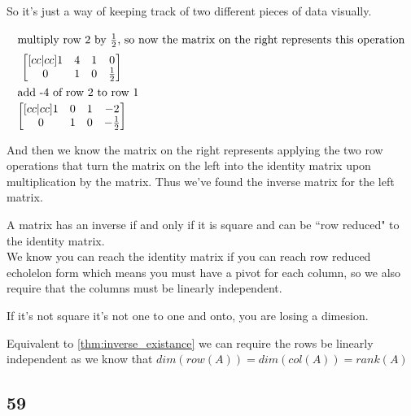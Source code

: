 \documentclass[11pt]{book}
\begin{document}
So it's just a way of keeping track of two different pieces of data visually.

\begin{gather*}
    \intertext{multiply row 2 by $\frac{1}{2}$, so now the matrix on the right represents this operation}
    \begin{bmatrix}[c c | c c]
    	1 & 4 & 1 & 0 \\
    	0 & 1 & 0 & \frac{1}{2} 
    \end{bmatrix}\\
    \intertext{add -4 of row 2 to row 1}
    \begin{bmatrix}[c c | c c]
    	1 & 0 & 1 & -2 \\
    	0 & 1 & 0 & -\frac{1}{2} 
    \end{bmatrix}
\end{gather*}

And then we know the matrix on the right represents applying the two row operations that turn the matrix on the left into the identity matrix upon multiplication by the matrix. Thus we've found the inverse matrix for the left matrix.

\begin{thm}\label{thm:inverse_existance}
    A matrix has an inverse if and only if it is square and can be ``row reduced" to the identity matrix.\\
    We know you can reach the identity matrix if you can reach row reduced echolelon form which means you must have a pivot for each column, so we also require that the columns must be linearly independent.
\end{thm}

\begin{remark}
    If it's not square it's not one to one and onto, you are losing a dimesion.  
\end{remark}

\begin{remark}
    Equivalent to \cref{thm:inverse_existance} we can require the rows be linearly independent as we know that $\mathit{dim} \left(\mathit{row} \left(A\right) \right) = \mathit{dim} \left(\mathit{col} \left(A\right) \right)= \mathit{rank} \left(A\right)  $   
\end{remark}

\subsection*{59}%
\label{sub:59}
\end{document}
